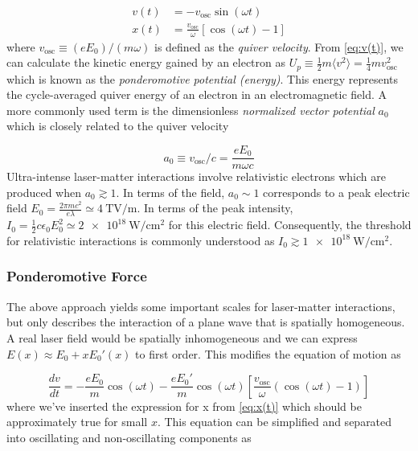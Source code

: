 \begin{align}
	v(t) &= - v_\text{osc} \sin(\omega t) \label{eq:v(t)} \\
	x(t) &= \frac{v_\text{osc}}{\omega} [\cos(\omega t) - 1] \label{eq:x(t)}
\end{align}
where $v_\text{osc} \equiv (e E_0) / (m \omega)$ is defined as the \emph{quiver velocity}. From \autoref{eq:v(t)}, we can calculate the kinetic energy gained by an electron as $U_p \equiv \frac{1}{2} m \langle v^2 \rangle = \frac{1}{4} m v_\text{osc}^2$ which is known as the \emph{ponderomotive potential (energy)}. This energy represents the cycle-averaged quiver energy of an electron in an electromagnetic field. A more commonly used term is the dimensionless \emph{normalized vector potential} $a_0$ which is closely related to the quiver velocity

\begin{equation}
	a_0 \equiv v_\text{osc} / c = \frac{e E_0}{m \omega c} \label{eq:a0}
\end{equation}
Ultra-intense laser-matter interactions involve relativistic electrons which are produced when $a_0 \gtrsim 1$. In terms of the field, $a_0 \sim 1$ corresponds to a peak electric field $E_0 = \frac{2 \pi m c^2}{e \lambda} \simeq \SI{4}{\tera \volt \per \meter}$. In terms of the peak intensity, $I_0 = \frac{1}{2} c \epsilon_0 E_0^2 \simeq \SI{2e18}{\watt \per \centi \meter \squared}$ for this electric field. Consequently, the threshold for relativistic interactions is commonly understood as $I_0 \gtrsim \SI{1e18}{\watt \per \centi \meter \squared}$. 

\subsubsection{Ponderomotive Force}
The above approach yields some important scales for laser-matter interactions, but only describes the interaction of a plane wave that is spatially homogeneous. A real laser field would be spatially inhomogeneous and we can express $E(x) \approx E_0 + x E_0'(x)$ to first order. This modifies the equation of motion as 

\begin{equation}
	\frac{d v}{d t} = - \frac{e E_0}{m} \cos(\omega t) - \frac{e E_0'}{m} \cos(\omega t)[ \frac{v_\text{osc}}{\omega}(\cos(\omega t) - 1)]
\end{equation}
where we've inserted the expression for x from \cref{eq:x(t)} which should be approximately true for small $x$. This equation can be simplified and separated into oscillating and non-oscillating components as


